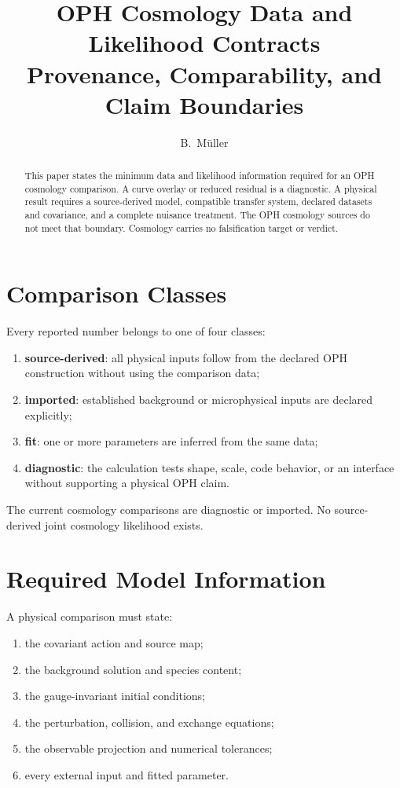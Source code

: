 \documentclass[11pt]{article}
\title{OPH Cosmology Data and Likelihood Contracts\\
\large Provenance, Comparability, and Claim Boundaries}
\author{B.\ M\"uller}
\date{\OPHPaperReleaseDate}
\begin{document}
\maketitle
\OPHPaperReleaseBanner

\begin{abstract}
This paper states the minimum data and likelihood information required for an
OPH cosmology comparison. A curve overlay or reduced residual is a diagnostic.
A physical result requires a source-derived model, compatible transfer system,
declared datasets and covariance, and a complete nuisance treatment. The OPH
cosmology sources do not meet that boundary. Cosmology carries no falsification
target or verdict.
\end{abstract}

\section{Comparison Classes}

Every reported number belongs to one of four classes:
\begin{enumerate}[leftmargin=2em]
\item \textbf{source-derived}: all physical inputs follow from the declared OPH
construction without using the comparison data;
\item \textbf{imported}: established background or microphysical inputs are
declared explicitly;
\item \textbf{fit}: one or more parameters are inferred from the same data;
\item \textbf{diagnostic}: the calculation tests shape, scale, code behavior, or
an interface without supporting a physical OPH claim.
\end{enumerate}

The current cosmology comparisons are diagnostic or imported. No source-derived
joint cosmology likelihood exists.

\section{Required Model Information}

A physical comparison must state:
\begin{enumerate}[leftmargin=2em]
\item the covariant action and source map;
\item the background solution and species content;
\item the gauge-invariant initial conditions;
\item the perturbation, collision, and exchange equations;
\item the observable projection and numerical tolerances;
\item every external input and fitted parameter.
\end{enumerate}
\end{document}

